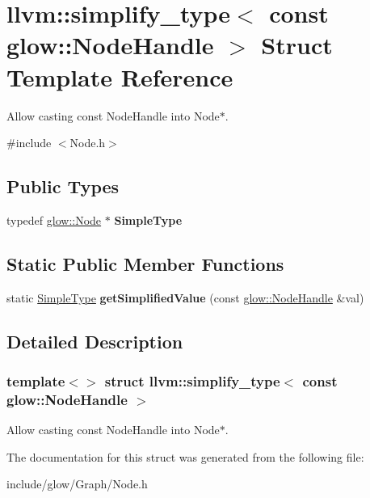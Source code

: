 \hypertarget{structllvm_1_1simplify__type_3_01const_01glow_1_1_node_handle_01_4}{}\section{llvm\+:\+:simplify\+\_\+type$<$ const glow\+:\+:Node\+Handle $>$ Struct Template Reference}
\label{structllvm_1_1simplify__type_3_01const_01glow_1_1_node_handle_01_4}


Allow casting const Node\+Handle into Node$\ast$.  




{\ttfamily \#include $<$Node.\+h$>$}

\subsection*{Public Types}
\begin{DoxyCompactItemize}
\item 
\mbox{\label{structllvm_1_1simplify__type_3_01const_01glow_1_1_node_handle_01_4_a15c647a3c3b880785112cce2d981a1a6}} 
typedef \hyperlink{classglow_1_1_node}{glow\+::\+Node} $\ast$ {\bfseries Simple\+Type}
\end{DoxyCompactItemize}
\subsection*{Static Public Member Functions}
\begin{DoxyCompactItemize}
\item 
\mbox{\label{structllvm_1_1simplify__type_3_01const_01glow_1_1_node_handle_01_4_a0390b15bc6bce381e0758b7690b911b8}} 
static \hyperlink{classglow_1_1_node}{Simple\+Type} {\bfseries get\+Simplified\+Value} (const \hyperlink{structglow_1_1_node_handle}{glow\+::\+Node\+Handle} \&val)
\end{DoxyCompactItemize}


\subsection{Detailed Description}
\subsubsection*{template$<$$>$\newline
struct llvm\+::simplify\+\_\+type$<$ const glow\+::\+Node\+Handle $>$}

Allow casting const Node\+Handle into Node$\ast$. 

The documentation for this struct was generated from the following file\+:\begin{DoxyCompactItemize}
\item 
include/glow/\+Graph/Node.\+h\end{DoxyCompactItemize}
